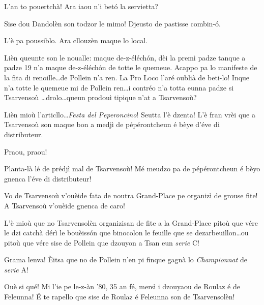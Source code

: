 \begin{drama}
\Genespeaks L'an to pouertchà! Ara iaou n'i bet\'o la servietta?


\Dorinaspeaks Sise dou Dandolèn son todzor le mimo! Djeusto de pastisse combin-\'o.

\Genespeaks L'è pa poussiblo. Ara cllouzèn maque lo local.

\ridocliou




\Taniaspeaks Lièn queunte son le noualle: maque de-z-éléch\'on, dèi la premì padze tanque a padze 19 n'a maque de-z-éléch\'on de totte le quemeue. Acappo pa lo manifeste de la fita di renoille\ldots de Pollein n'a ren. La Pro Loco l'aré oublià de beti-lo! Inque n'a totte le quemeue mi de Pollein ren\ldots i contréo n'a totta eunna padze si Tsarvensoù \ldots drolo\ldots queun prodouì tipique n'at a Tsarvensoù?


\Taniaspeaks Lièn mioù l'articllo\ldots \textit{Festa del Peperoncino}! Seutta l'è dzenta! L'è fran vrèi que a Tsarvensoù son maque bon a medjì de pépérontcheun é bèye d'éve di distributeur.

\Laurentspeaks{} Praou, praou!


\Laurentspeaks{} Planta-là lé de prédjì mal de Tsarvensoù! Mé meudzo pa de pépérontcheun é bèyo gnenca l'éve di distributeur!

\Taniaspeaks Vo de Tsarvensoù v'ouèide fata de noutra Grand-Place pe organizì de grouse fite! A Tsarvensoù v'ouèide gnenca de caro!

\Laurentspeaks L'è mioù que no Tsarvensolèn organizisan de fite a la Grand-Place pitoù que vére le dzi catchà dérì le bouèiss\'on que binocolon le feuille que se dezarbeuillon\ldots ou pitoù que vére sise de Pollein que dzouyon a Tsan eun \textit{serie} C!

\Taniaspeaks Grama lenva! \`Eitsa que no de Pollein n'en pi finque gagnà lo \textit{Championnat} de \textit{serie} A!

\Laurentspeaks Ouè si qué! Mi l'ie pe le-z-àn '80, 35 an fé, mersì i dzouyaou de Roulaz é de Feleunna! \'E te rapello que sise de Roulaz é Feleunna son de Tsarvensolèn!


\end{drama}
